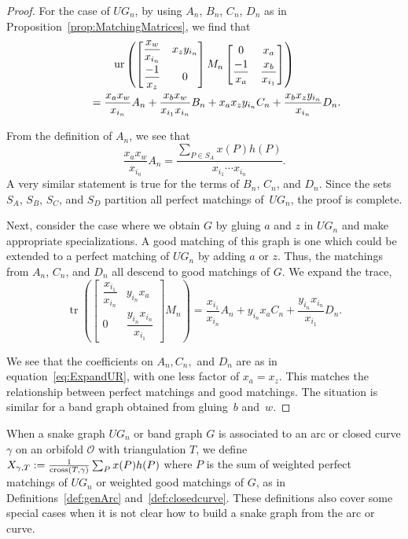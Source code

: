 \documentclass[pdftex]{sigma}%
\numberwithin{equation}{section}
\begin{document}
\begin{proof}For the case of $UG_n$, by using $A_n$, $B_n$, $C_n$, $D_n$ as in Proposition~\ref{prop:MatchingMatrices}, we find that \begin{gather}
\operatorname{ur} \left( \begin{bmatrix} \dfrac{x_w}{x_{i_n}} & x_z y_{i_n} \vspace{1mm}\\ \dfrac{-1}{x_z} & 0 \end{bmatrix} M_n \begin{bmatrix} 0 & x_a \vspace{1mm}\\ \dfrac{-1}{x_a} & \dfrac{x_b}{x_{i_1}} \end{bmatrix}\right)\nonumber\\
\qquad{} = \frac{x_a x_w}{x_{i_n}} A_n + \frac{x_b x_w}{x_{i_1}x_{i_n}} B_n + x_a x_z y_{i_n} C_n + \frac{x_b x_z y_{i_n}}{x_{i_n}} D_n.\label{eq:ExpandUR}
\end{gather}

From the definition of $A_n$, we see that
\[ \frac{x_a x_w}{x_{i_n}} A_n = \frac{\sum_{P \in S_A} x(P)h(P)}{x_{i_1}\cdots x_{i_n}}.\] A very similar statement is true for the terms of $B_n$, $C_n$, and $D_n$. Since the sets $S_A$, $S_B$, $S_C$, and $ S_D$ partition all perfect matchings of~$UG_n$, the proof is complete.

Next, consider the case where we obtain $G$ by gluing $a$ and $z$ in $UG_n$ and make appropriate specializations. A good matching of this graph is one which could be extended to a perfect matching of $UG_n$ by adding $a$ or $z$. Thus, the matchings from $A_n$, $C_n$, and $D_n$ all descend to good matchings of $G$. We expand the trace, \[
\operatorname{tr} \left( \begin{bmatrix} \dfrac{x_{i_1}}{x_{i_n}} & y_{i_n} x_a\\ 0 & \dfrac{y_{i_n} x_{i_n}}{x_{i_1}} \end{bmatrix} M_n \right) = \frac{x_{i_1}}{x_{i_n}} A_n + y_{i_n} x_a C_n + \frac{y_{i_n} x_{i_n}}{x_{i_1}} D_n.
\]

We see that the coefficients on $A_n, C_n,$ and $D_n$ are as in equation~\eqref{eq:ExpandUR}, with one less factor of $x_a = x_z$. This matches the relationship between perfect matchings and good matchings. The situation is similar for a band graph obtained from gluing~$b$ and~$w$.
\end{proof}

When a snake graph $UG_n$ or band graph $G$ is associated to an arc or closed curve $\gamma$ on an orbifold $\mathcal{O}$ with triangulation $T$, we define $X_{\gamma, T} := \frac{1}{{\rm cross}(T,\gamma)}\sum_P x(P) h(P) $ where $P$ is the sum of weighted perfect matchings of $UG_n$ or weighted good matchings of $G$, as in Definitions~\ref{def:genArc} and~\ref{def:closedcurve}. These definitions also cover some special cases when it is not clear how to build a snake graph from the arc or curve.
\end{document}
